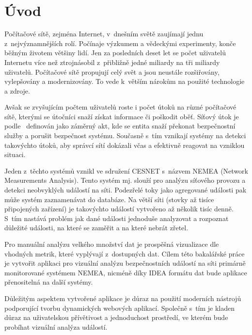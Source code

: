 
\newcommand\note[1]{{\Large \textcolor{red}{#1}}}

\chapter{Úvod}
Počítačové sítě, zejména Internet, v~dnešním světě zaujímají jednu z~nejvýznamnějších rolí. Počínaje výzkumem a vědeckými experimenty, konče běžným životem většiny lidí. Jen za posledních deset let se počet uživatelů Internetu více než ztrojnásobil z~přibližně jedné miliardy na tři miliardy uživatelů. Počítačové sítě propujují celý svět a jsou neustále rozšiřovány, vylepšovány a modernizovány. To vede k~větším nárokům na použité technologie a zdroje. 

Avšak se zvyšujícím počtem uživatelů roste i počet útoků na různé počítačové sítě, kterými se útočníci snaží získat informace či poškodit oběť. Síťový útok je podle~\cite{rfc:attack} definován jako záměrný akt, kde se entita snaží překonat bezpečnostní služby a porušit bezpečnost systému. Současně s~tím vznikají systémy na detekci takovýchto útoků, aby správcí sítí dokázali včas a efektivně reagovat na vzniklou situaci.

Jeden z~těchto systémů vznikl ve sdružení CESNET s~názvem NEMEA (Network Measurements Analysis). Tento systém mj. slouží pro analýzu síťového provozu a detekci neobvyklých událostí na síti. Podezřelé toky jako agregované události pak může systém zaznamenávat  do databáze. Na větší síti (stovky až tisíce připojených zařízení) je takovýchto událostí vytvořeno až několik tisíc denně. S~tím nastává problém jak dané události jednoduše analyzovat a rozpoznat důležité události, na které se zaměřit a na které nebrát zřetel.

Pro manuální analýzu velkého množství dat je prospěšná vizualizace dle vhodných metrik, které vyplývají z~dostupných dat. Cílem této bakalářské práce je vytvořit aplikaci pro vizuální analýzu bezpečnostních událostí na síti primárně monitorované systémem NEMEA, nicméně díky IDEA formátu dat bude aplikace přenositelná na další systémy. 

Důležitým aspektem vytvořené aplikace je důraz na použití moderních nástrojů podporující tvorbu dynamických webových aplikací. Společně s~tím je kladen důraz na uživatelskou přívětivost a jednoduchost prostředí, ve kterém bude probíhat vizuální analýza událostí.

